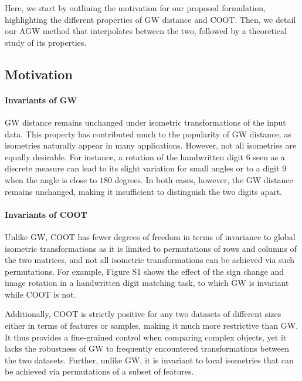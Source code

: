 Here, we start by outlining the motivation for our proposed formulation,
highlighting the different properties of GW distance and COOT. Then,
we detail our AGW method that interpolates between the two, followed by a
theoretical study of its properties.

\subsection{Motivation}

\paragraph{Invariants of GW} GW distance remains unchanged under isometric transformations of
the input data. This property has contributed much to the popularity of GW distance,
as isometries naturally appear in many applications. However,
not all isometries are equally desirable. For instance, a rotation of the
handwritten digit $6$ seen as a discrete measure can lead to its slight variation
for small angles or to a digit $9$ when the angle is close to $180$ degrees. In both cases,
however, the GW distance remains unchanged, making it insufficient to distinguish
the two digits apart.

\paragraph{Invariants of COOT} Unlike GW, COOT has fewer degrees of freedom
in terms of invariance to global isometric transformations as it is limited to
permutations of rows and columns of the two matrices, and not all isometric transformations
can be achieved via such permutations. For example, Figure S1 shows the effect of the sign change
and image rotation in a handwritten digit matching task, to which GW is invariant while COOT is not.

Additionally, COOT is strictly positive for any two datasets of different sizes either
in terms of features or samples, making it much more restrictive than GW.
It thus provides a fine-grained control when comparing complex objects,
yet it lacks the robustness of GW to frequently encountered transformations
between the two datasets. Further, unlike GW, it is invariant to local isometries
that can be achieved via permutations of a subset of features.

